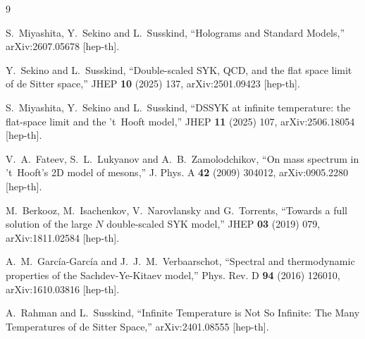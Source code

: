 \documentclass[11pt]{article}
\begin{document}
\begin{thebibliography}{9}

S.~Miyashita, Y.~Sekino and L.~Susskind,
``Holograms and Standard Models,''
arXiv:2607.05678 [hep-th].

Y.~Sekino and L.~Susskind,
``Double-scaled SYK, QCD, and the flat space limit of de Sitter space,''
JHEP \textbf{10} (2025) 137,
arXiv:2501.09423 [hep-th].

S.~Miyashita, Y.~Sekino and L.~Susskind,
``DSSYK at infinite temperature: the flat-space limit and the 't~Hooft model,''
JHEP \textbf{11} (2025) 107,
arXiv:2506.18054 [hep-th].

V.~A.~Fateev, S.~L.~Lukyanov and A.~B.~Zamolodchikov,
``On mass spectrum in 't~Hooft's 2D model of mesons,''
J. Phys. A \textbf{42} (2009) 304012,
arXiv:0905.2280 [hep-th].

M.~Berkooz, M.~Isachenkov, V.~Narovlansky and G.~Torrents,
``Towards a full solution of the large $N$ double-scaled SYK model,''
JHEP \textbf{03} (2019) 079,
arXiv:1811.02584 [hep-th].

A.~M.~Garc\'ia-Garc\'ia and J.~J.~M.~Verbaarschot,
``Spectral and thermodynamic properties of the Sachdev-Ye-Kitaev model,''
Phys. Rev. D \textbf{94} (2016) 126010,
arXiv:1610.03816 [hep-th].

A.~Rahman and L.~Susskind,
``Infinite Temperature is Not So Infinite: The Many Temperatures of de Sitter
Space,''
arXiv:2401.08555 [hep-th].

\end{thebibliography}
\end{document}
